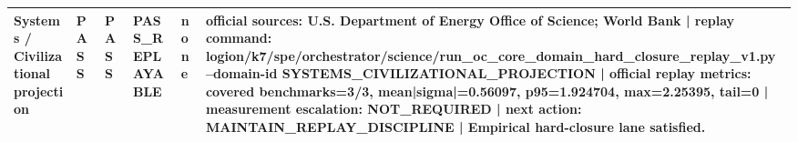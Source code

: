 \begin{longtable}{p{}p{}p{}p{}p{}p{}}
Systems / Civilizational projection & PASS & PASS & PASS\_REPLAYABLE & none & official sources: U.S. Department of Energy Office of Science; World Bank | replay command: logion/k7/spe/orchestrator/science/run\_oc\_core\_domain\_hard\_closure\_replay\_v1.py --domain-id SYSTEMS\_CIVILIZATIONAL\_PROJECTION | official replay metrics: covered benchmarks=3/3, mean|sigma|=0.56097, p95=1.924704, max=2.25395, tail=0 | measurement escalation: NOT\_REQUIRED | next action: MAINTAIN\_REPLAY\_DISCIPLINE | Empirical hard-closure lane satisfied. \\
\bottomrule
\end{longtable}
